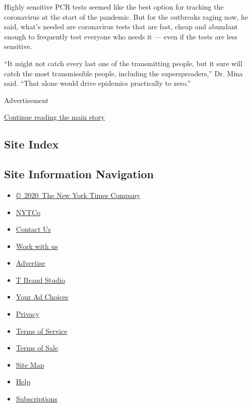 Highly sensitive PCR tests seemed like the best option for tracking the
coronavirus at the start of the pandemic. But for the outbreaks raging
now, he said, what's needed are coronavirus tests that are fast, cheap
and abundant enough to frequently test everyone who needs it --- even if
the tests are less sensitive.

``It might not catch every last one of the transmitting people, but it
sure will catch the most transmissible people, including the
superspreaders,'' Dr. Mina said. ``That alone would drive epidemics
practically to zero.''

Advertisement

\protect\hyperlink{after-bottom}{Continue reading the main story}

\hypertarget{site-index}{%
\subsection{Site Index}\label{site-index}}

\hypertarget{site-information-navigation}{%
\subsection{Site Information
Navigation}\label{site-information-navigation}}

\begin{itemize}
\tightlist
\item
  \href{https://help.nytimes3xbfgragh.onion/hc/en-us/articles/115014792127-Copyright-notice}{©~2020~The
  New York Times Company}
\end{itemize}

\begin{itemize}
\tightlist
\item
  \href{https://www.nytco.com/}{NYTCo}
\item
  \href{https://help.nytimes3xbfgragh.onion/hc/en-us/articles/115015385887-Contact-Us}{Contact
  Us}
\item
  \href{https://www.nytco.com/careers/}{Work with us}
\item
  \href{https://nytmediakit.com/}{Advertise}
\item
  \href{http://www.tbrandstudio.com/}{T Brand Studio}
\item
  \href{https://www.nytimes3xbfgragh.onion/privacy/cookie-policy\#how-do-i-manage-trackers}{Your
  Ad Choices}
\item
  \href{https://www.nytimes3xbfgragh.onion/privacy}{Privacy}
\item
  \href{https://help.nytimes3xbfgragh.onion/hc/en-us/articles/115014893428-Terms-of-service}{Terms
  of Service}
\item
  \href{https://help.nytimes3xbfgragh.onion/hc/en-us/articles/115014893968-Terms-of-sale}{Terms
  of Sale}
\item
  \href{https://spiderbites.nytimes3xbfgragh.onion}{Site Map}
\item
  \href{https://help.nytimes3xbfgragh.onion/hc/en-us}{Help}
\item
  \href{https://www.nytimes3xbfgragh.onion/subscription?campaignId=37WXW}{Subscriptions}
\end{itemize}
